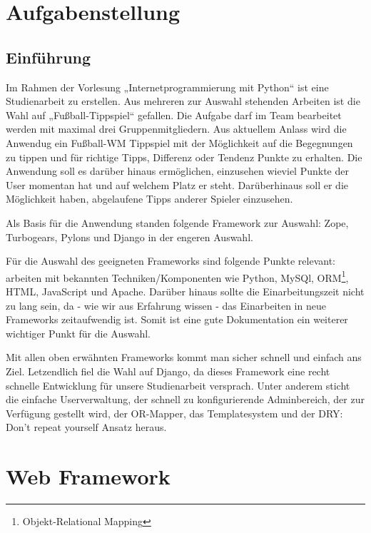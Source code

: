 




  
\newpage

\tableofcontents
\newpage
\chapter{Aufgabenstellung}
\section{Einführung}
Im Rahmen der Vorlesung „Internetprogrammierung mit Python“ ist eine
Studienarbeit zu erstellen. Aus mehreren zur Auswahl stehenden Arbeiten ist die
Wahl auf „Fußball-Tippspiel“ gefallen. Die Aufgabe darf im Team bearbeitet
werden mit maximal drei Gruppenmitgliedern. Aus aktuellem Anlass wird die
Anwendug ein Fußball-WM Tippspiel mit der Möglichkeit auf die Begegnungen zu
tippen und für richtige Tipps, Differenz oder Tendenz Punkte zu erhalten. Die
Anwendung soll es darüber hinaus ermöglichen, einzusehen wieviel Punkte der
User momentan hat und auf welchem Platz er steht. Darüberhinaus soll er die
Möglichkeit haben, abgelaufene Tipps anderer Spieler einzusehen.

Als Basis für die Anwendung standen folgende Framework zur Auswahl: Zope,
Turbogears, Pylons und Django in der engeren Auswahl.

Für die Auswahl des geeigneten Frameworks sind folgende Punkte relevant:
arbeiten mit bekannten Techniken/Komponenten wie Python, MySQl,
ORM\footnote{Objekt-Relational Mapping}, HTML, JavaScript und Apache. 
Darüber hinaus sollte die Einarbeitungszeit nicht zu lang sein, da - wie wir aus
Erfahrung wissen - das Einarbeiten in neue Frameworks zeitaufwendig ist. Somit 
ist eine gute Dokumentation ein weiterer wichtiger Punkt für die Auswahl.

Mit allen oben erwähnten Frameworks kommt man sicher schnell und einfach ans
Ziel. Letzendlich fiel die Wahl auf Django, da dieses Framework eine recht
schnelle Entwicklung für unsere Studienarbeit versprach. Unter anderem sticht
die einfache Userverwaltung, der schnell zu konfigurierende Adminbereich, der
zur Verfügung gestellt wird, der OR-Mapper, das Templatesystem und der DRY: 
Don't repeat yourself Ansatz heraus. 

\chapter{Web Framework}
